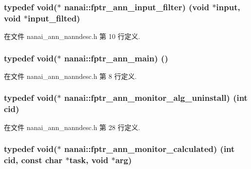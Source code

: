 \subsubsection[{fptr\+\_\+ann\+\_\+input\+\_\+filter}]{\setlength{\rightskip}{0pt plus 5cm}typedef void($\ast$ nanai\+::fptr\+\_\+ann\+\_\+input\+\_\+filter) (void $\ast$input, void $\ast$input\+\_\+filted)}\label{namespacenanai_a681d28f80aa95597ffc268b3b01abcfc}


在文件 nanai\+\_\+ann\+\_\+nanndesc.\+h 第 10 行定义.

\hypertarget{namespacenanai_a3be739c74db7d7304ff72dbcefbdc046}{}
\subsubsection[{fptr\+\_\+ann\+\_\+main}]{\setlength{\rightskip}{0pt plus 5cm}typedef void($\ast$ nanai\+::fptr\+\_\+ann\+\_\+main) ()}\label{namespacenanai_a3be739c74db7d7304ff72dbcefbdc046}


在文件 nanai\+\_\+ann\+\_\+nanndesc.\+h 第 8 行定义.

\hypertarget{namespacenanai_a04b231ce428a771ab1a9aace53be65c6}{}
\subsubsection[{fptr\+\_\+ann\+\_\+monitor\+\_\+alg\+\_\+uninstall}]{\setlength{\rightskip}{0pt plus 5cm}typedef void($\ast$ nanai\+::fptr\+\_\+ann\+\_\+monitor\+\_\+alg\+\_\+uninstall) (int cid)}\label{namespacenanai_a04b231ce428a771ab1a9aace53be65c6}


在文件 nanai\+\_\+ann\+\_\+nanndesc.\+h 第 28 行定义.

\hypertarget{namespacenanai_afc00080af95a1dc2349880f03d7d6a88}{}
\subsubsection[{fptr\+\_\+ann\+\_\+monitor\+\_\+calculated}]{\setlength{\rightskip}{0pt plus 5cm}typedef void($\ast$ nanai\+::fptr\+\_\+ann\+\_\+monitor\+\_\+calculated) (int cid, const char $\ast$task, void $\ast$arg)}\label{namespacenanai_afc00080af95a1dc2349880f03d7d6a88}


